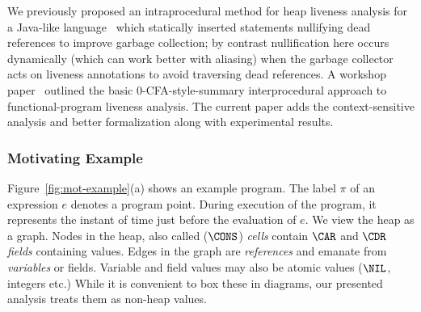 \documentclass{llncs}
\begin{document}
We  previously proposed  an intraprocedural  method for  heap liveness
analysis   for   a   Java-like   language~\cite{khedker07heap}   which
statically inserted  statements nullifying dead  references to improve
garbage collection; by  contrast nullification here occurs dynamically
(which can work better with  aliasing) when the garbage collector acts
on  liveness  annotations  to  avoid traversing  dead  references.   A
workshop    paper~\cite{karkare07liveness}    outlined    the    basic
0-CFA-style-summary  interprocedural  approach  to  functional-program
liveness  analysis.   The  current  paper adds  the  context-sensitive
analysis and better formalization along with experimental results.

\kern -3pt   %


\setcounter{page}{2}
\subsubsection{Motivating Example}
\label{sec:motiv}

Figure~\ref{fig:mot-example}(a) shows  an example program.   The label
$\pi$ of an expression $e$  denotes a program point.  During execution
of  the program, it  represents the  instant of  time just  before the
evaluation  of  $e$.  
We  view the  heap  as a graph.  
Nodes in the heap, also  called  ($\CONS$) {\em  cells\/} contain $\CAR$ and $\CDR$ {\em fields}
containing values.  Edges in the graph are {\em references} and
emanate from {\em variables} or fields.
Variable and field values may also be atomic values ($\NIL$, integers etc.)
While it is convenient to box these in diagrams, our presented
analysis treats them as non-heap values.
\end{document}
